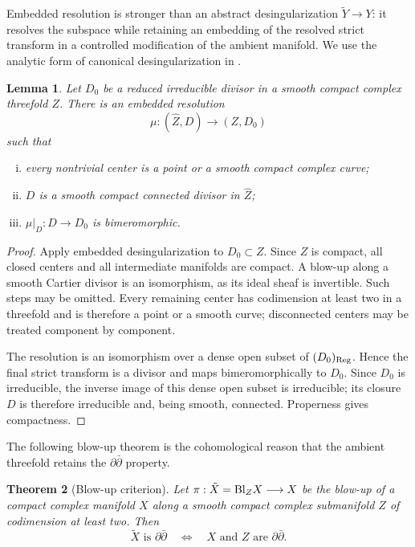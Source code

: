 \documentclass[11pt]{amsart}
\numberwithin{equation}{section}
\def\Bl{{\rm Bl}}
\def\Reg{{\rm Reg}}
\theoremstyle{plain}
\newtheorem{thm}{Theorem}[section]
\newtheorem{lemma}[thm]{Lemma}
\theoremstyle{definition}
\begin{document}
Embedded resolution is stronger than an abstract desingularization
$\widetilde Y\to Y$: it resolves the subspace while retaining an embedding of
the resolved strict transform in a controlled modification of the ambient
manifold.  We use the analytic form of canonical desingularization in
\cite[Theorem 1.6 and Remarks 1.7]{BM97}.

\begin{lemma}\label{resolution-centers}
Let $D_0$ be a reduced irreducible divisor in a smooth compact complex
threefold $Z$.  There is an embedded resolution
\begin{equation*}%
 \mu:(\widehat Z,D)\longrightarrow(Z,D_0)
\end{equation*}
such that
\begin{enumerate}[(i)]
\item every nontrivial center is a point or a smooth compact complex curve;
\item $D$ is a smooth compact connected divisor in $\widehat Z$;
\item $\mu|_D:D\to D_0$ is bimeromorphic.
\end{enumerate}
\end{lemma}

\begin{proof}
Apply embedded desingularization to $D_0\subset Z$.  Since $Z$ is compact, all
closed centers and all intermediate manifolds are compact.  A blow-up along a
smooth Cartier divisor is an isomorphism, as its ideal sheaf is
invertible.  Such steps may be omitted.  Every remaining center has
codimension at least two in a threefold and is therefore a point or a smooth
curve; disconnected centers may be treated component by component.

The resolution is an isomorphism over a dense open subset of $(D_0)_{\Reg}$.
Hence the final strict transform is a divisor and maps bimeromorphically to
$D_0$.  Since $D_0$ is irreducible, the inverse image of this dense open subset is
irreducible; its closure $D$ is therefore irreducible and, being smooth,
connected.  Properness gives compactness.
\end{proof}

The following blow-up theorem is the cohomological reason that the ambient
threefold retains the $\partial\bar\partial$ property.

\begin{thm}[Blow-up criterion]\label{blowup-criterion}
Let $\pi:\tilde{X}=\Bl_Z X\longrightarrow X$ be the blow-up of a compact complex manifold $X$
along a smooth compact complex submanifold $Z$ of codimension at least two.
Then
\begin{equation*}%
 \tilde{X}\text{ is }\partial\bar\partial
 \quad\Longleftrightarrow\quad
 X\text{ and }Z\text{ are }\partial\bar\partial.
\end{equation*}
\end{thm}
\end{document}
